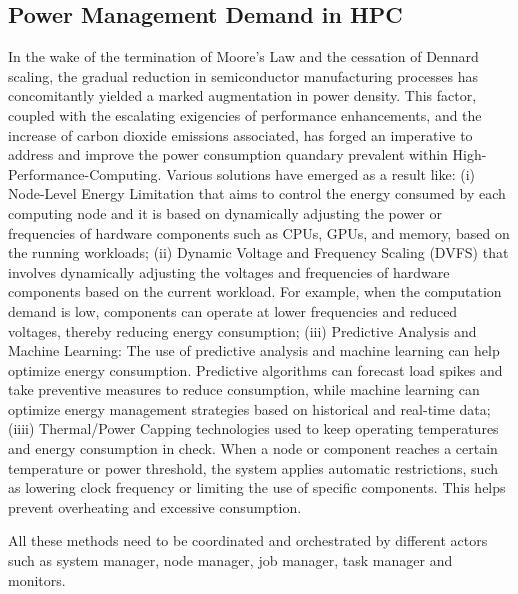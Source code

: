 \subsection{Power Management Demand in HPC}
In the wake of the termination of Moore's Law and the cessation of Dennard scaling, the gradual reduction in semiconductor manufacturing processes has concomitantly yielded a marked augmentation in power density\cite{MOSFET-Scaling}. This factor, coupled with the escalating exigencies of performance enhancements, and the increase of carbon dioxide emissions associated, has forged an imperative to address and improve the power consumption quandary prevalent within High-Performance-Computing.
Various solutions have emerged as a result like: (i) Node-Level Energy Limitation that aims to control the energy consumed by each computing node and it is based on dynamically adjusting the power or frequencies of hardware components such as CPUs, GPUs, and memory, based on the running workloads; (ii) Dynamic Voltage and Frequency Scaling (DVFS) that involves dynamically adjusting the voltages and frequencies of hardware components based on the current workload. For example, when the computation demand is low, components can operate at lower frequencies and reduced voltages, thereby reducing energy consumption; (iii) Predictive Analysis and Machine Learning: The use of predictive analysis and machine learning can help optimize energy consumption. Predictive algorithms can forecast load spikes and take preventive measures to reduce consumption, while machine learning can optimize energy management strategies based on historical and real-time data; (iiii) Thermal/Power Capping technologies used to keep operating temperatures and energy consumption in check. When a node or component reaches a certain temperature or power threshold, the system applies automatic restrictions, such as lowering clock frequency or limiting the use of specific components. This helps prevent overheating and excessive consumption.

\noindent All these methods need to be coordinated and orchestrated by different actors such as system manager, node manager, job manager, task manager and monitors.

